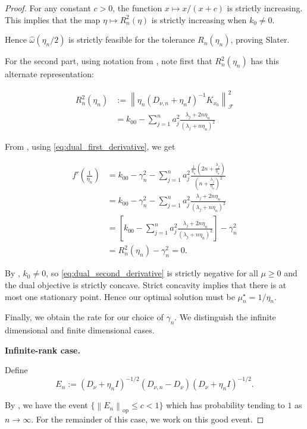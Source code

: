 \documentclass[11pt]{article}
\newcommand{\F}{\mathcal{F}}
\newcommand{\op}{\mathrm{op}}
\newcommand{\norm}[1]{\left\lVert #1\right\rVert}
\begin{document}
\begin{proof}
For any constant $c>0$, the function $x\mapsto x/(x+c)$ is strictly increasing. This implies that the map $\eta\mapsto R_n^2(\eta)$ is strictly increasing when $k_0\neq0$. 

Hence $\widehat\omega(\eta_n/2)$ is strictly feasible for the tolerance $R_n(\eta_n)$, proving Slater.

For the second part, using notation from , note first that $R_n^2(\eta_n)$ has this alternate representation:

\begin{align*}
R_n^2(\eta_n)
&:=\left\|\eta_n(D_{\nu,n}+\eta_n I)^{-1}K_{x_0}\right\|_{\F}^2\\
&=k_{00}-\sum_{j=1}^na_j^2
\frac{\lambda_j+2n\eta_n}
{(\lambda_j+n\eta_n)^2}
\end{align*}


From , using \eqref{eq:dual_first_derivative}, we get

\begin{align*}
f'\!\left(\frac{1}{\eta_n}\right)
&=
k_{00}-\gamma_n^2
-\sum_{j=1}^na_j^2\frac{\frac{1}{\eta_n}\left(2n+\frac{\lambda_j}{\eta_n}\right)
}{
\left(n+\frac{\lambda_j}{\eta_n}\right)^2}
\\
&=
k_{00}-\gamma_n^2-\sum_{j=1}^na_j^2\frac{\lambda_j+2n\eta_n}
{(\lambda_j+n\eta_n)^2}\\
&=\left[k_{00}-\sum_{j=1}^na_j^2\frac{\lambda_j+2n\eta_n}{(\lambda_j+n\eta_n)^2}\right]-\gamma_n^2
\\
&=R_n^2(\eta_n)-\gamma_n^2 = 0.
\end{align*}



By , $k_0\neq0$, so \eqref{eq:dual_second_derivative} is strictly negative for all $\mu\ge0$ and the dual objective is strictly concave. Strict concavity implies that there is at most one stationary point. Hence our optimal solution must be  $\mu_n^\star=1/\eta_n$.

Finally, we obtain the rate for our choice of $\gamma_n$. We distinguish the infinite dimensional and finite dimensional cases. 

\noindent\textbf{Infinite-rank case.}

Define
\[
  E_n:=(D_\nu+\eta_nI)^{-1/2}(D_{\nu,n}-D_\nu)(D_\nu+\eta_nI)^{-1/2}.
\]


By , we have the event $\{\norm{E_n}_{\op}\leq c<1\}$ which has probability tending to $1$ as $n\to\infty$. For the remainder of this case, we work on this good event.


\end{proof}
\end{document}
